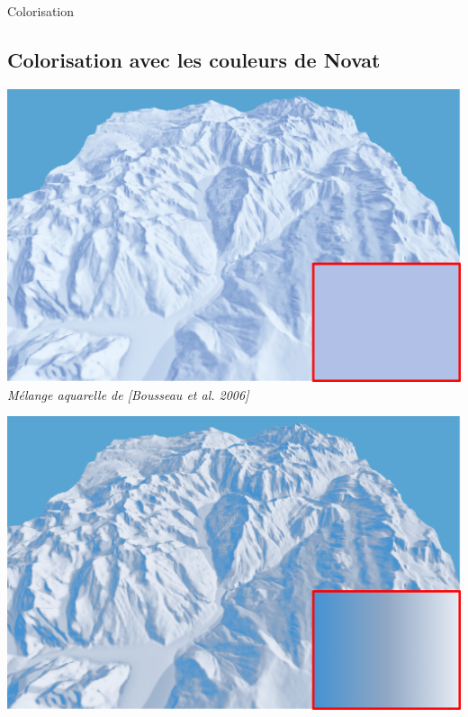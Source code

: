 \documentclass{beamer}
\begin{document}
\begin{frame}{Colorisation}
\subsection*{Colorisation avec les couleurs de Novat}
\begin{center}
	\begin{minipage}[t]{0.32\linewidth}
    \begin{center}
    	\includegraphics[width=1.0\linewidth]{Resultats/aquarelle.png}\\
 		\textit{Mélange aquarelle de [Bousseau et al. 2006]}
    \end{center}
    \end{minipage}
    \begin{minipage}[t]{0.32\linewidth}
    \begin{center}
    	\includegraphics[width=1.0\linewidth]{Resultats/colorMap.png}\\

\end{center}
\end{minipage}
\end{center}
\end{frame}
\end{document}
